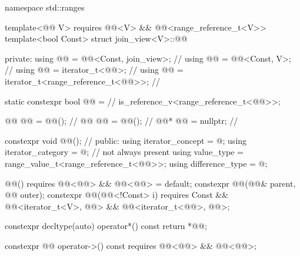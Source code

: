 %
\begin{codeblock}
namespace std::ranges {
  template<@@ V>
    requires @@<V> && @@<range_reference_t<V>>
  template<bool Const>
  struct join_view<V>::@@ {
  private:
    using @@    = @@<Const, join_view>;            // \expos
    using @@      = @@<Const, V>;                    // \expos
    using @@ = iterator_t<@@>;                         // \expos
    using @@ = iterator_t<range_reference_t<@@>>;      // \expos

    static constexpr bool @@ =                      // \expos
      is_reference_v<range_reference_t<@@>>;

    @@ @@ = @@();                             // \expos
    @@ @@ = @@();                             // \expos
    @@* @@  = nullptr;                                 // \expos

    constexpr void @@();                                   // \expos
  public:
    using iterator_concept  = @\seebelow@;
    using iterator_category = @\seebelow@;                        // not always present
    using value_type        = range_value_t<range_reference_t<@@>>;
    using difference_type   = @\seebelow@;

    @@() requires @@<@@> &&
                         @\itcorr[-2]@<@@> = default;
    constexpr @@(@@& parent, @@ outer);
    constexpr @@(@@<!Const> i)
      requires Const &&
               @@<iterator_t<V>, @@> &&
               @@<iterator_t<@@>, @@>;

    constexpr decltype(auto) operator*() const { return *@@; }

    constexpr @@ operator->() const
      requires @@<@@> && @@<@@>;

}}
\end{codeblock}
